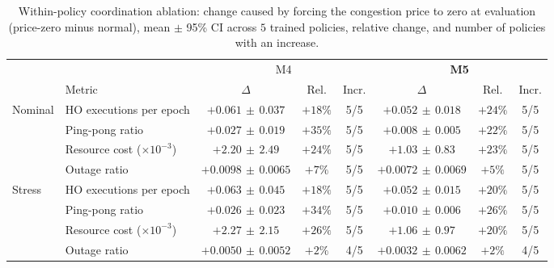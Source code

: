 \documentclass[journal]{IEEEtran}
\begin{document}
\begin{table}[t]
\centering
\caption{Within-policy coordination ablation: change caused by forcing the congestion price to zero at evaluation (price-zero minus normal), mean $\pm$ 95\% CI across $5$ trained policies, relative change, and number of policies with an increase.}
\label{tab:ablation}
\footnotesize
\begin{tabular}{@{}llcccccc@{}}
\toprule
 & & \multicolumn{3}{c}{M4} & \multicolumn{3}{c}{\textbf{M5}}\\
\cmidrule(lr){3-5}\cmidrule(l){6-8}
 & Metric & $\Delta$ & Rel. & Incr. & $\Delta$ & Rel. & Incr.\\
\midrule
\multirow{4}{*}{Nominal} & HO executions per epoch & $+0.061\,{\pm}\,0.037$ & $+18\%$ & 5/5 & $+0.052\,{\pm}\,0.018$ & $+24\%$ & 5/5\\
 & Ping-pong ratio & $+0.027\,{\pm}\,0.019$ & $+35\%$ & 5/5 & $+0.008\,{\pm}\,0.005$ & $+22\%$ & 5/5\\
 & Resource cost ($\times10^{-3}$) & $+2.20\,{\pm}\,2.49$ & $+24\%$ & 5/5 & $+1.03\,{\pm}\,0.83$ & $+23\%$ & 5/5\\
 & Outage ratio & $+0.0098\,{\pm}\,0.0065$ & $+7\%$ & 5/5 & $+0.0072\,{\pm}\,0.0069$ & $+5\%$ & 5/5\\
\midrule
\multirow{4}{*}{Stress} & HO executions per epoch & $+0.063\,{\pm}\,0.045$ & $+18\%$ & 5/5 & $+0.052\,{\pm}\,0.015$ & $+20\%$ & 5/5\\
 & Ping-pong ratio & $+0.026\,{\pm}\,0.023$ & $+34\%$ & 5/5 & $+0.010\,{\pm}\,0.006$ & $+26\%$ & 5/5\\
 & Resource cost ($\times10^{-3}$) & $+2.27\,{\pm}\,2.15$ & $+26\%$ & 5/5 & $+1.06\,{\pm}\,0.97$ & $+20\%$ & 5/5\\
 & Outage ratio & $+0.0050\,{\pm}\,0.0052$ & $+2\%$ & 4/5 & $+0.0032\,{\pm}\,0.0062$ & $+2\%$ & 4/5\\
\bottomrule
\end{tabular}
\end{table}
\end{document}
